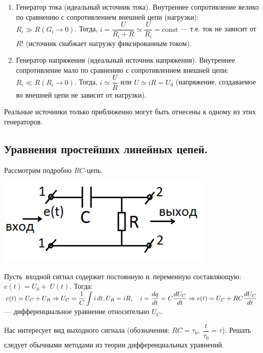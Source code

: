 \documentclass[../main/main.tex]{subfiles}
\begin{document}
\begin{enumerate}
    \item Генератор тока (идеальный источник тока).
        Внутреннее сопротивление велико по сравнению с сопротивлением внешней цепи (нагрузки): $R_i \gg R (G_i \rightarrow 0)$. Тогда, $i = \dfrac{U}{R_i + R} \simeq \dfrac{U}{R_i} = \text{const}$ --- т.е. ток не зависит от $R$! (источник снабжает нагрузку фиксированным током). 
    
    \item Генератор напряжения (идеальный источник напряжения).
     Внутреннее сопротивление мало по сравнению с сопротивлением внешней цепи: $R_i \ll R (R_i \rightarrow 0)$. Тогда, $i \simeq \dfrac{U}{R}$ или $U \simeq iR = U_0$ (напряжение, создаваемое во внешней цепи не зависит от нагрузки).  
\end{enumerate}

Реальные источники только приближенно могут быть отнесены к одному из этих генераторов.

\subsection{Уравнения простейших линейных цепей.}

Рассмотрим подробно $RC$-цепь.

\begin{minipage}{6cm}
\centering
\includegraphics[scale=0.6]{../section01/images/rc_simple/rc_simple.png} %
\end{minipage} \hfill   
\begin{minipage}{9cm}
Пусть~входной сигнал содержит постоянную и~переменную составляющую: $e(t) = U_0 +~U(t)$. Тогда: $e(t) = U_C + U_R \Rightarrow U_C = \dfrac{1}{C} \displaystyle \int i \, dt,\\U_R = iR,\quad i=\dfrac{dq}{dt} = C \dfrac{dU_C}{dt} \Rightarrow\\e(t) = U_C + RC\dfrac{dU_C}{dt}$ --- дифференциальное уравнение относительно $U_C$. 
\end{minipage}

Нас интересует вид выходного сигнала (обозначения: $RC = \tau_0,~\dfrac{t}{\tau_0} = \tau$). Решать следует обычными методами из теории дифференциальных уравнений. %
\end{document}
